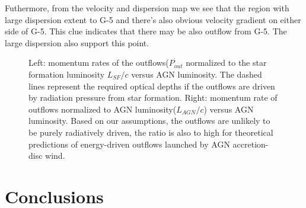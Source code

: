 	Futhermore, from the velocity and dispersion map we see that the region with large dispersion extent to G-5 and there's also obvious velocity gradient on either side of G-5. This clue indicates that there may be also outflow from G-5. The large dispersion also support this point.  
	\begin{figure}
		\centering
		\label{coupeffic}
		\caption{Left: momentum rates of the outflows($\dot{P_{out}}$ normalized to the star formation luminosity $L_{SF}/c$ versus AGN luminosity. The dashed lines represent the required optical depths if the outflows are driven by radiation pressure from star formation. Right: momentum rate of outflows normalized to AGN luminosity($L_{AGN}/c$) versus AGN luminosity. Based on our assumptions, the outflows are unlikely to be purely radiatively driven, the ratio is also to high for theoretical predictions of energy-driven outflows launched by AGN accretion-disc wind.}
	\end{figure}

\section{Conclusions}
\label{sec:conclusions}

